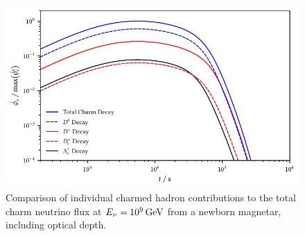 \begin{figure}[H]
	\centering
	\includegraphics{../plots/build/magnetar_charm_decay_comparison_with.pdf}
	\caption[Magnetar $\nu \kern+0.5pt$ flux from $c$ decay including optical depth.]
			{Comparison of individual charmed hadron contributions to the total charm neutrino flux at
			 $E_\nu = \kern-0.5pt \qty{e9}{\giga\electronvolt}$ from a newborn magnetar, including optical depth.}
	\label{fig:magnetar-charm-comparison-with}
\end{figure}
